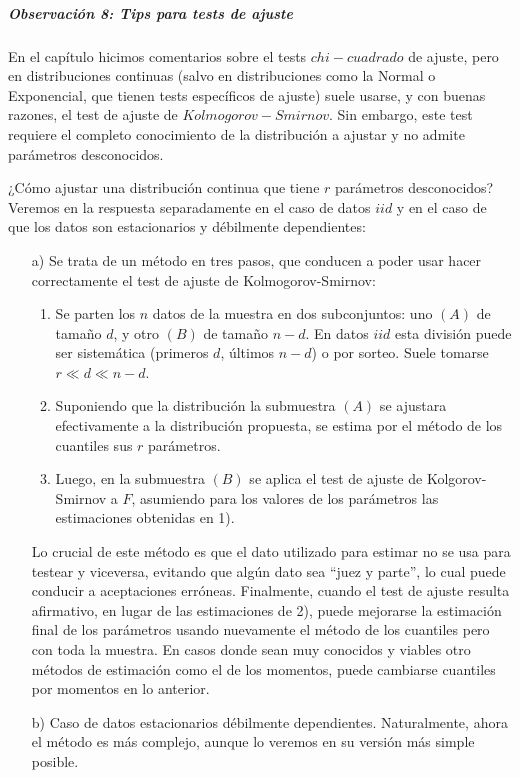 \documentclass[
  12pt]{article}
\begin{document}
\subparagraph{Observación 8: Tips para tests de
ajuste}\label{observaciuxf3n-8-tips-para-tests-de-ajuste}

En el capítulo hicimos comentarios sobre el tests \(chi- cuadrado\) de
ajuste, pero en distribuciones continuas (salvo en distribuciones como
la Normal o Exponencial, que tienen tests específicos de ajuste) suele
usarse, y con buenas razones, el test de ajuste de
\(Kolmogorov-Smirnov\). Sin embargo, este test requiere el completo
conocimiento de la distribución a ajustar y no admite parámetros
desconocidos.

¿Cómo ajustar una distribución continua que tiene \(r\) parámetros
desconocidos? Veremos en la respuesta separadamente en el caso de datos
\(iid\) y en el caso de que los datos son estacionarios y débilmente
dependientes:

\begin{itemize}
\item[a)] Se trata de un método en tres pasos, que conducen a poder usar hacer correctamente el test de ajuste de Kolmogorov-Smirnov: 
\begin{enumerate}
\item Se parten los $n$ datos de la muestra en dos subconjuntos: uno $(A)$ de tamaño $d$, y otro $(B)$ de tamaño  $n-d$. En datos $iid$ esta división puede ser sistemática (primeros $d$, últimos $n-d$) o por sorteo. Suele tomarse $r  \ll d  \ll n-d$.
\item Suponiendo que la distribución la submuestra $(A)$ se ajustara efectivamente a la distribución propuesta, se estima por el método de los cuantiles sus $r$ parámetros.
\item Luego, en la submuestra $(B)$ se aplica el test de ajuste de Kolgorov-Smirnov a $F$, asumiendo para los valores de los parámetros las estimaciones obtenidas en 1).
\end{enumerate}
Lo crucial de este método es que el dato utilizado para estimar no se usa para testear y viceversa, evitando que algún dato sea “juez y parte”, lo cual puede conducir a aceptaciones erróneas.
Finalmente, cuando el test de ajuste resulta afirmativo, en lugar de las estimaciones de 2), puede mejorarse la estimación final de los parámetros usando nuevamente el método de los cuantiles pero con toda la muestra.
En casos donde sean muy conocidos y viables otro métodos de estimación como el de los momentos, puede cambiarse cuantiles por momentos en lo anterior.
\item[b)] Caso de datos estacionarios débilmente dependientes.
Naturalmente, ahora el método es más complejo, aunque lo veremos en su versión más simple posible.

\end{itemize}
\end{document}
